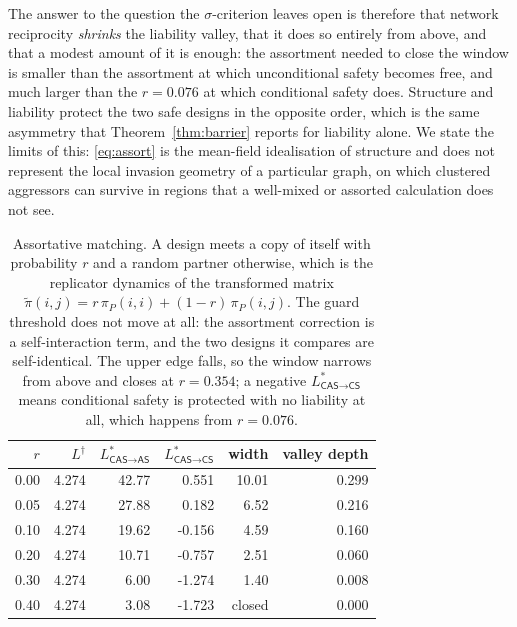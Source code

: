 \documentclass[pdflatex]{sn-jnl}
\theoremstyle{thmstyleone}
\theoremstyle{thmstylethree}
\theoremstyle{thmstyletwo}
\newcommand{\AS}{\textsf{AS}}
\newcommand{\CS}{\textsf{CS}}
\newcommand{\CAS}{\textsf{CAS}}
\newcommand{\piP}{\pi_{P}}
\begin{document}
The answer to the question the $\sigma$-criterion leaves open is therefore
that network reciprocity \emph{shrinks} the liability valley, that it does so
entirely from above, and that a modest amount of it is enough: the assortment
needed to close the window is smaller than the assortment at which
unconditional safety becomes free, and much larger than the $r=0.076$ at which
conditional safety does. Structure and liability protect the two safe designs
in the opposite order, which is the same asymmetry that
Theorem~\ref{thm:barrier} reports for liability alone. We state the limits of
this: \eqref{eq:assort} is the mean-field idealisation of structure and does
not represent the local invasion geometry of a particular graph, on which
clustered aggressors can survive in regions that a well-mixed or assorted
calculation does not see.

\begin{table}[!ht]
\centering
\caption{Assortative matching. A design meets a copy of itself with probability $r$ and a random partner otherwise, which is the replicator dynamics of the transformed matrix $\tilde\pi(i,j)=r\,\piP(i,i)+(1-r)\,\piP(i,j)$. The guard threshold does not move at all: the assortment correction is a self-interaction term, and the two designs it compares are self-identical. The upper edge falls, so the window narrows from above and closes at $r=0.354$; a negative $L^{*}_{\CAS\to\CS}$ means conditional safety is protected with no liability at all, which happens from $r=0.076$.}
\label{tab:assortment}
\begin{tabular}{rrrrrr}
\toprule
$r$ & $L^{\dagger}$ & $L^{*}_{\CAS\to\AS}$ & $L^{*}_{\CAS\to\CS}$ & width & valley depth \\
\midrule
0.00 & 4.274 & 42.77 & 0.551 & 10.01 & 0.299 \\
0.05 & 4.274 & 27.88 & 0.182 & 6.52 & 0.216 \\
0.10 & 4.274 & 19.62 & -0.156 & 4.59 & 0.160 \\
0.20 & 4.274 & 10.71 & -0.757 & 2.51 & 0.060 \\
0.30 & 4.274 & 6.00 & -1.274 & 1.40 & 0.008 \\
0.40 & 4.274 & 3.08 & -1.723 & closed & 0.000 \\
\bottomrule
\end{tabular}
\end{table}
\end{document}
